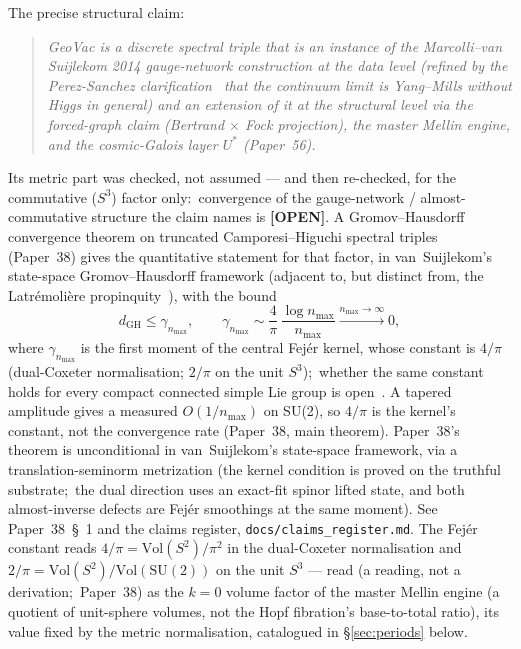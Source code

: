 \documentclass[11pt,a4paper]{article}
\begin{document}
The precise structural claim:

\begin{quote}
\itshape
GeoVac is a discrete spectral triple that is an \emph{instance} of
the Marcolli--van Suijlekom 2014 gauge-network construction
\cite{marcolli_vs2014} at the data level (refined by the
Perez-Sanchez clarification~\cite{perez_sanchez2024, perez_sanchez2025}
that the continuum limit is
Yang--Mills without Higgs in general) and an \emph{extension} of it
at the structural level via the forced-graph claim (Bertrand
$\times$ Fock projection), the master Mellin engine, and the
cosmic-Galois layer $U^*$ (Paper~56).
\end{quote}

Its metric part was checked, not assumed --- and then re-checked, for
the commutative ($S^3$) factor only:\ convergence of the gauge-network /
almost-commutative structure the claim names is \textbf{[OPEN]}.  A
Gromov--Hausdorff convergence theorem on truncated
Camporesi--Higuchi spectral triples~\cite{loutey_paper38} (Paper~38)
gives the quantitative statement for that factor, in van~Suijlekom's state-space
Gromov--Hausdorff framework (adjacent to, but distinct from, the
Latr\'emoli\`ere propinquity~\cite{latremoliere2017}), with the bound
\begin{equation}
\label{eq:propinquity_rate}
d_{\mathrm{GH}} \le \gamma_{n_{\max}},
\qquad \gamma_{n_{\max}} \sim
\frac{4}{\pi}\,\frac{\log n_{\max}}{n_{\max}}
\xrightarrow{n_{\max} \to \infty} 0,
\end{equation}
where $\gamma_{n_{\max}}$ is the first moment of the central Fej\'er kernel,
whose constant is $4/\pi$ (dual-Coxeter normalisation; $2/\pi$ on the
unit $S^3$);\ whether the same constant holds for every compact
connected simple Lie group is open~\cite{loutey_paper40}.  A tapered
amplitude gives a measured $O(1/n_{\max})$ on SU(2), so $4/\pi$ is the
kernel's constant, not the convergence rate (Paper~38, main theorem).
Paper~38's theorem is unconditional in
van~Suijlekom's state-space framework, via a translation-seminorm
metrization (the kernel condition is proved on the truthful
substrate;\ the dual direction uses an exact-fit spinor lifted state,
and both almost-inverse defects are Fej\'er smoothings at the same
moment).  See Paper~38~\S~1 and the claims register,
\texttt{docs/claims\_register.md}.
The Fej\'er constant reads $4/\pi = \mathrm{Vol}(S^2)/\pi^2$ in the
dual-Coxeter normalisation and $2/\pi = \mathrm{Vol}(S^2)/\mathrm{Vol}(\mathrm{SU}(2))$
on the unit $S^3$ --- read (a reading, not a derivation;\ Paper~38) as
the $k = 0$ volume factor of the master Mellin engine (a quotient of
unit-sphere volumes, not the Hopf fibration's base-to-total ratio), its value
fixed by the metric normalisation, catalogued in
\S\ref{sec:periods} below.
\end{document}
